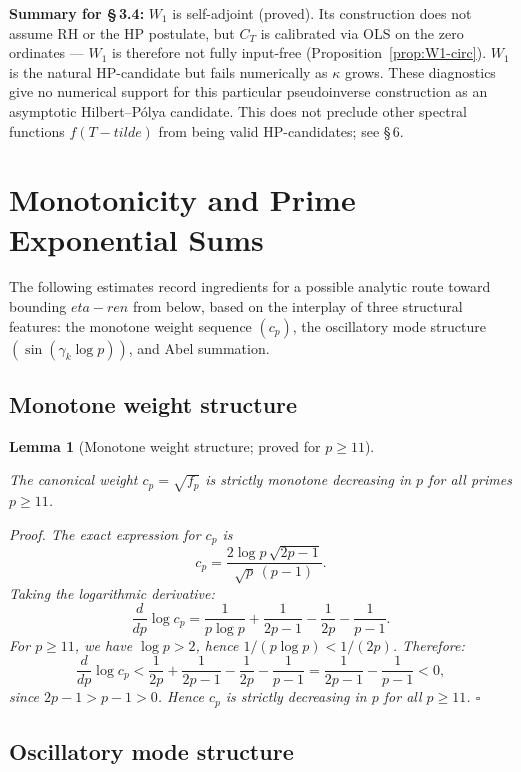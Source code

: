 \documentclass[11pt]{article}
\def\Tt{T-tilde}%
\def\etaren{eta-ren}%
\newtheorem{lemma}[theorem]{Lemma}
\newcommand{\etaren}{\eta_{\mathrm{ren}}}
\newcommand{\Tt}{\widetilde{T}}
\newcommand{\CT}{C_{T}}
\newcommand{\Wone}{W_1}
\begin{document}
\textbf{Summary for \S\,3.4:}
$\Wone$ is self-adjoint (proved).
Its construction does not assume RH or the HP postulate, but $\CT$
is calibrated via OLS on the zero ordinates --- $\Wone$ is therefore
not fully input-free (Proposition~\ref{prop:W1-circ}).
$\Wone$ is the natural HP-candidate but fails numerically as
$\kappa$ grows.
These diagnostics give no numerical support for
this particular pseudoinverse construction as an
asymptotic Hilbert--P\'olya candidate.
This does not preclude other spectral functions $f(\Tt)$ from being valid
HP-candidates; see \S\,6.

\section{Monotonicity and Prime Exponential Sums}

The following estimates record ingredients for a possible
analytic route toward bounding $\etaren$ from below,
based on the interplay of three structural features:
the monotone weight sequence $(c_p)$,
the oscillatory mode structure $(\sin(\gamma_k\log p))$,
and Abel summation.

\subsection{Monotone weight structure}

\begin{lemma}[Monotone weight structure; proved for $p\geq 11$]\label{lem:M1}

The canonical weight $c_p = \sqrt{f_p}$ is strictly monotone
decreasing in $p$ for all primes $p\geq 11$.

\emph{Proof.}
The exact expression for $c_p$ is
\[
c_p = \frac{2\log p\,\sqrt{2p-1}}{\sqrt{p}\,(p-1)}.
\]
Taking the logarithmic derivative:
\[
\frac{d}{dp}\log c_p
= \frac{1}{p\log p} + \frac{1}{2p-1} - \frac{1}{2p} - \frac{1}{p-1}.
\]
For $p\ge 11$, we have $\log p > 2$, hence $1/(p\log p) < 1/(2p)$.
Therefore:
\[
\frac{d}{dp}\log c_p
< \frac{1}{2p} + \frac{1}{2p-1} - \frac{1}{2p} - \frac{1}{p-1}
= \frac{1}{2p-1} - \frac{1}{p-1} < 0,
\]
since $2p-1 > p-1 > 0$. Hence $c_p$ is strictly decreasing
in $p$ for all $p\ge 11$. $\square$
\end{lemma}

\subsection{Oscillatory mode structure}
\end{document}
